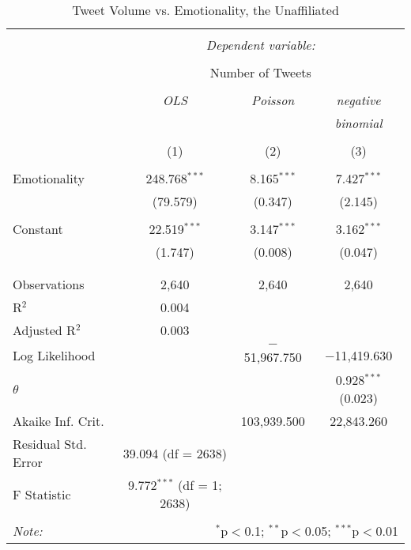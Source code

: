 \begin{table}[!htbp] \centering 
  \caption{Tweet Volume vs. Emotionality, the Unaffiliated} 
      \label{} 
    \begin{tabular}{@{\extracolsep{5pt}}lccc} 
    \\[-1.8ex]\hline 
    \hline \\[-1.8ex] 
     & \multicolumn{3}{c}{\textit{Dependent variable:}} \\ 
    \cline{2-4} 
    \\[-1.8ex] & \multicolumn{3}{c}{Number of Tweets} \\ 
    \\[-1.8ex] & \textit{OLS} & \textit{Poisson} & \textit{negative} \\ 
     & \textit{} & \textit{} & \textit{binomial} \\ 
    \\[-1.8ex] & (1) & (2) & (3)\\ 
    \hline \\[-1.8ex] 
     Emotionality & 248.768$^{***}$ & 8.165$^{***}$ & 7.427$^{***}$ \\ 
      & (79.579) & (0.347) & (2.145) \\ 
      & & & \\ 
     Constant & 22.519$^{***}$ & 3.147$^{***}$ & 3.162$^{***}$ \\ 
      & (1.747) & (0.008) & (0.047) \\ 
      & & & \\ 
    \hline \\[-1.8ex] 
    Observations & 2,640 & 2,640 & 2,640 \\ 
    R$^{2}$ & 0.004 &  &  \\ 
    Adjusted R$^{2}$ & 0.003 &  &  \\ 
    Log Likelihood &  & $-$51,967.750 & $-$11,419.630 \\ 
    $\theta$ &  &  & 0.928$^{***}$  (0.023) \\ 
    Akaike Inf. Crit. &  & 103,939.500 & 22,843.260 \\ 
    Residual Std. Error & 39.094 (df = 2638) &  &  \\ 
    F Statistic & 9.772$^{***}$ (df = 1; 2638) &  &  \\ 
    \hline 
    \hline \\[-1.8ex] 
    \textit{Note:}  & \multicolumn{3}{r}{$^{*}$p$<$0.1; $^{**}$p$<$0.05; $^{***}$p$<$0.01} \\ 
    \end{tabular} 
\end{table}  

